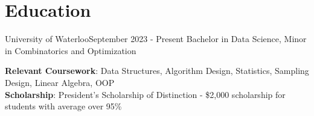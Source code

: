 \section{Education}
  \resumeSubHeadingListStart
    \resumeSubheading
      {University of Waterloo}{September 2023 - Present}
      {Bachelor in Data Science, Minor in Combinatorics and Optimization}{}
      
  \begin{itemize}[leftmargin=0.15in, label={}]
    \small{\item{
      	\textbf{Relevant Coursework}{: Data Structures, Algorithm Design, Statistics, Sampling Design, Linear Algebra, OOP} \\
      	\textbf{Scholarship}{: President's Scholarship of Distinction - \$2,000 scholarship for students with average over 95\%}
    }}
  \end{itemize}
  \resumeSubHeadingListEnd

